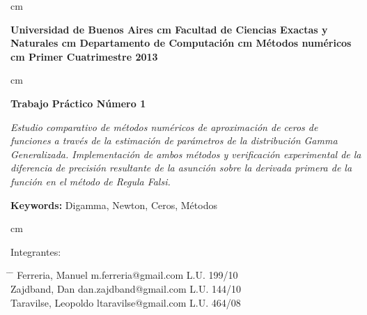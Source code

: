  cm
\begin{flushright}
\huge\bf Universidad de Buenos Aires
 cm
\Large\bf Facultad de Ciencias Exactas y Naturales
 cm
\Large\bf Departamento de Computaci\'on
 cm
\Large\bf  M\'etodos num\'ericos
 cm
\Large\bf Primer Cuatrimestre 2013
\end{flushright}

 cm
\begin{center}
\LARGE\bf Trabajo Pr\'actico N\'umero 1

\vskip 1.0cm
\normalsize \emph{Estudio comparativo de m\'etodos num\'ericos de 
aproximaci\'on de ceros de funciones a trav\'es de la estimaci\'on de 
par\'ametros de la distribuci\'on Gamma Generalizada. Implementaci\'on de 
ambos m\'etodos y verificaci\'on experimental de la diferencia de precisi\'on 
resultante de la asunci\'on sobre la derivada primera de la funci\'on en el 
m\'etodo de Regula Falsi.}

\vskip 1.0cm
\large {\bf Keywords:} Digamma, Newton, Ceros, M\'etodos

\end{center}



 cm
\begin{flushleft}
\large Integrantes:
\begin{tabbing}
\hspace{5cm} \= \hspace{5.5cm} \= \hspace{3cm} \kill
Ferreria, Manuel \> m.ferreria@gmail.com \> L.U. 199/10  \\
Zajdband, Dan \> dan.zajdband@gmail.com \> L.U. 144/10 \\
Taravilse, Leopoldo \> ltaravilse@gmail.com \> L.U. 464/08\\
\end{tabbing}
\end{flushleft}
